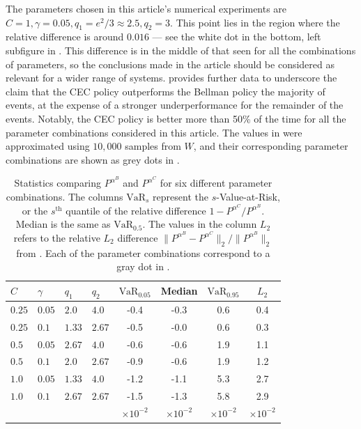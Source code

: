\documentclass[main.tex]{subfiles}
\begin{document}
The parameters chosen in this article's numerical experiments
are $C=1,\gamma=0.05,q_1=e^2/3\approx2.5,q_2=3$. This point lies
in the region where the relative difference is around $0.016$ --- see the
white dot in the
bottom, left subfigure in .
This difference is in the middle of that seen for all the
combinations of parameters, so the conclusions made in the article
should be considered as relevant for a wider range of systems.
 provides further data to underscore
the claim that the CEC policy
outperforms the Bellman policy the
majority of events, at the expense of a stronger underperformance
for the remainder of the events. Notably, the CEC policy is better
more than 50\% of the time for all the parameter
combinations considered in this article. The values in
 were approximated using $10,000$ samples
from $W$, and their corresponding parameter combinations are shown as
grey dots in .

\begin{table}[htbp]
  \centering
  \begin{tabular}{llllcccc}
    $C$ & $\gamma$ & $q_1$ & $q_2$ & $\mbox{VaR}_{0.05}$
    &Median & $\mbox{VaR}_{0.95}$ &$L_2$\\
    \toprule
    $0.25$ & $0.05$ & $2.0$ & $4.0$ & -0.4 & -0.3 & 0.6 & 0.4 \\
    $0.25$ & $0.1$ & $1.33$ & $2.67$ & -0.5 & -0.0 & 0.6 & 0.3 \\
    $0.5$ & $0.05$ & $2.67$ & $4.0$ & -0.6 & -0.6 & 1.9 & 1.1 \\
    $0.5$ & $0.1$ & $2.0$ & $2.67$ & -0.9 & -0.6 & 1.9 & 1.2 \\
    $1.0$ & $0.05$ & $1.33$ & $4.0$ & -1.2 & -1.1 & 5.3 & 2.7 \\
    $1.0$ & $0.1$ & $2.67$ & $2.67$ & -1.5 & -1.3 & 5.8 & 2.9\\
    &&&&$\times 10^{-2}$&$\times 10^{-2}$&$\times 10^{-2}$&$\times 10^{-2}$\\
    \bottomrule
  \end{tabular}
  \caption{Statistics comparing $P^{\alpha^B}$ and $P^{\alpha^C}$ for six different
    parameter combinations. The columns $\mbox{VaR}_s$ represent the
    $s$-Value-at-Risk, or the $s^{\text{th}}$ quantile of the relative
    difference
    $1-P^{\alpha^C}/P^{\alpha^B}$. Median is the same as $\mbox{VaR}_{0.5}$.
    The values in the column $L_2$ refers to the relative $L_2$
    difference $\|P^{\alpha^B}-P^{\alpha^C}\|_2/\|P^{\alpha^B}\|_2$
    from . Each of the parameter
    combinations correspond to a gray dot in .
  }\label{tbl:paramcomparisons}
\end{table}
\biblio
\end{document}
